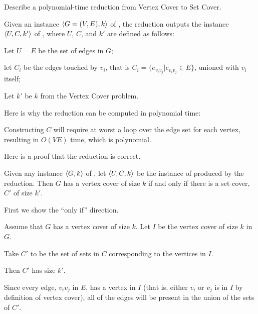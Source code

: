 \documentclass[11pt]{article}
\begin{document}
\begin{problems}


  \problem %

    Describe a polynomial-time reduction from Vertex Cover to Set Cover.

  Given an instance $\langle G=(V,E),k \rangle$ of ,
  the reduction outputs the instance $\langle U,C,k' \rangle$ of ,
  where $U$, $C$, and $k'$ are defined as follows:

  \lineacross 

  Let $U = E$ be the set of edges in $G$;

  let $C_i$ be the edges touched by $v_i$, that is $C_i = \{e_{v_iv_j} | e_{v_iv_j} \in E\}$, unioned with $v_i$ itself;
  
  Let $k'$ be $k$ from the Vertex Cover problem.
  
  \lineacross 

  \medskip 
  Here is why the reduction can be computed in polynomial time:
  
  \lineacross 

  Constructing $C$ will require at worst a loop over the edge set for each vertex, resulting in $O(VE)$ time, which is polynomial.

  \lineacross 
  
  \medskip 
  Here is a proof that the reduction is correct.
  \begin{lemma}
    Given any instance $\langle G,k \rangle$ of ,
    let $\langle U,C,k \rangle$ be the instance of  produced by the reduction.
    Then $G$ has a vertex cover of size $k$
    if and only if there is a set cover, $C'$ of size $k'$.
  \end{lemma}
  \begin{longFormProof}
    \step First we show the ``only if'' direction.
    \begin{block}[1oi]
      {Assume that $G$ has a vertex cover of size $k$.}
      \step Let $I$ be the vertex cover of size $k$ in $G$.
      \smallskip 

      \step Take $C'$ to be the set of sets in $C$ corresponding to the vertices in $I$.

      \step Then $C'$ has size $k'$.

      \step Since every edge, $v_iv_j$ in $E$, has a vertex in $I$ (that is, either $v_i$ or $v_j$ is in $I$ by definition of vertex cover), 
              all of the edges will be present in the union of the sets of $C'$.


\end{block}
\end{longFormProof}
\end{problems}
\end{document}
